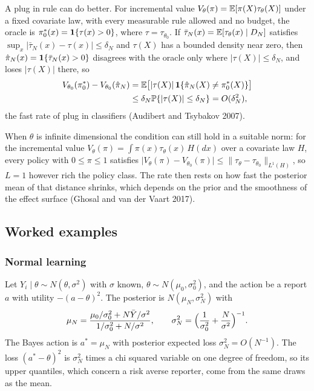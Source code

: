 A plug in rule can do better. For incremental value $V_\theta(\pi)=\mathbb{E}[\pi(X)\tau_\theta(X)]$ under a fixed covariate law, with every measurable rule allowed and no budget, the oracle is $\pi_0^\ast(x)=\mathbf{1}\{\tau(x)>0\}$, where $\tau=\tau_{\theta_0}$. If $\bar\tau_N(x)=\mathbb{E}[\tau_\theta(x)\mid D_N]$ satisfies $\sup_x\lvert\bar\tau_N(x)-\tau(x)\rvert\le\delta_N$ and $\tau(X)$ has a bounded density near zero, then $\hat\pi_N(x)=\mathbf{1}\{\bar\tau_N(x)>0\}$ disagrees with the oracle only where $\lvert\tau(X)\rvert\le\delta_N$, and loses $\lvert\tau(X)\rvert$ there, so
\[
\begin{aligned}
V_{\theta_0}(\pi_0^\ast)-V_{\theta_0}(\hat\pi_N)&=\mathbb{E}\bigl[\lvert\tau(X)\rvert\,\mathbf{1}\{\hat\pi_N(X)\ne\pi_0^\ast(X)\}\bigr]\\
&\le\delta_N\mathbb{P}\{\lvert\tau(X)\rvert\le\delta_N\}=O(\delta_N^2),
\end{aligned}
\]
the fast rate of plug in classifiers (Audibert and Tsybakov 2007).

When $\theta$ is infinite dimensional the condition can still hold in a suitable norm: for the incremental value $V_\theta(\pi)=\int\pi(x)\tau_\theta(x)\,H(dx)$ over a covariate law $H$, every policy with $0\le\pi\le1$ satisfies $\lvert V_\theta(\pi)-V_{\theta_0}(\pi)\rvert\le\lVert\tau_\theta-\tau_{\theta_0}\rVert_{L^1(H)}$, so $L=1$ however rich the policy class. The rate then rests on how fast the posterior mean of that distance shrinks, which depends on the prior and the smoothness of the effect surface (Ghosal and van der Vaart 2017).

\subsection{Worked examples}\label{gbc:sec:examples}



\subsubsection{Normal learning}\label{gbc:sec:normal}

Let $Y_i\mid\theta\sim N(\theta,\sigma^2)$ with $\sigma$ known, $\theta\sim N(\mu_0,\sigma_0^2)$, and the action be a report $a$ with utility $-(a-\theta)^2$. The posterior is $N(\mu_N,\sigma_N^2)$ with
\[
\mu_N = \frac{\mu_0/\sigma_0^2 + N\bar Y/\sigma^2}{1/\sigma_0^2 + N/\sigma^2},\qquad
\sigma_N^2 = \Bigl(\frac{1}{\sigma_0^2} + \frac{N}{\sigma^2}\Bigr)^{-1}.
\]
The Bayes action is $a^\ast=\mu_N$ with posterior expected loss $\sigma_N^2 = O(N^{-1})$. The loss $(a^\ast-\theta)^2$ is $\sigma_N^2$ times a chi squared variable on one degree of freedom, so its upper quantiles, which concern a risk averse reporter, come from the same draws as the mean.

